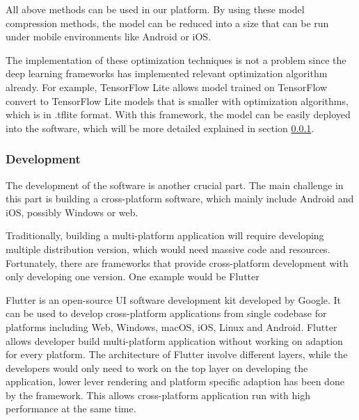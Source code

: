                All above methods can be used in our platform. By using these model compression methods, the model can be reduced into a size that can be run under mobile environments like Android or iOS.

                The implementation of these optimization techniques is not a problem since the deep learning frameworks has implemented relevant optimization algorithm already. For example, TensorFlow Lite allows model trained on TensorFlow convert to TensorFlow Lite models that is smaller with optimization algorithms, which is in .tflite format. With this framework, the model can be easily deployed into the software, which will be more detailed explained in section \ref{development}.
            \subsubsection{Development}\label{development}
                The development of the software is another crucial part. The main challenge in this part is building a cross-platform software, which mainly include Android and iOS, possibly Windows or web.

                Traditionally, building a multi-platform application will require developing multiple distribution version, which would need massive code and resources. Fortunately, there are frameworks that provide cross-platform development with only developing one version. One example would be Flutter

                Flutter is an open-source UI software development kit developed by Google. It can be used to develop cross-platform applications from single codebase for platforms including Web, Windows, macOS, iOS, Linux and Android. Flutter allows developer build multi-platform application without working on adaption for every platform. The architecture of Flutter involve different layers, while the developers would only need to work on the top layer on developing the application, lower lever rendering and platform specific adaption has been done by the framework. This allows cross-platform application run with high performance at the same time.

